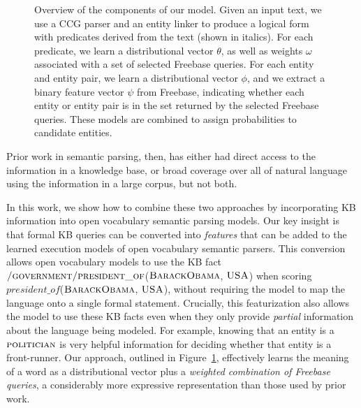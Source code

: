 \documentclass[11pt,letterpaper]{article}
\newcommand{\figref}[1]{Figure~\ref{fig:#1}}
\newcommand{\lexicalpredicate}[1]{\ensuremath{\textit{#1}}}
\newcommand{\formalpredicate}[1]{{\small \ensuremath{\textsc{#1}}}}
\begin{document}
\begin{figure}[ht]

  \caption{Overview of the components of our model.  Given an input text, we use a CCG parser and
  an entity linker to produce a logical form with predicates derived from the text (shown in
  italics).  For each predicate, we learn a distributional vector $\theta$, as well as weights
  $\omega$ associated with a set of selected Freebase queries.  For each entity and entity pair, we
  learn a distributional vector $\phi$, and we extract a binary feature vector $\psi$ from
  Freebase, indicating whether each entity or entity pair is in the set returned by the selected
  Freebase queries.  These models are combined to assign probabilities to candidate entities.}
  \label{fig:overview}
\end{figure}

Prior work in semantic parsing, then, has either had direct access to the information in a
knowledge base, or broad coverage over all of natural language using the information in a large
corpus, but not both.

In this work, we show how to combine these two approaches by incorporating KB information into open
vocabulary semantic parsing models.  Our key insight is that formal KB queries can be converted
into \emph{features} that can be added to the learned execution models of open vocabulary semantic
parsers.  This conversion allows open vocabulary models to use the KB fact
\formalpredicate{/government/president\_of}(\formalpredicate{BarackObama}, \formalpredicate{USA})
when scoring \lexicalpredicate{president\_of}(\formalpredicate{BarackObama},
\formalpredicate{USA}), without requiring the model to map the language onto a single formal
statement.  Crucially, this featurization also allows the model to use these KB facts even when
they only provide \emph{partial} information about the language being modeled.  For example,
knowing that an entity is a \formalpredicate{politician} is very helpful information for deciding
whether that entity is a front-runner.  Our approach, outlined in \figref{overview}, effectively
learns the meaning of a word as a distributional vector plus a \emph{weighted combination of
Freebase queries}, a considerably more expressive representation than those used by prior work.
\end{document}
